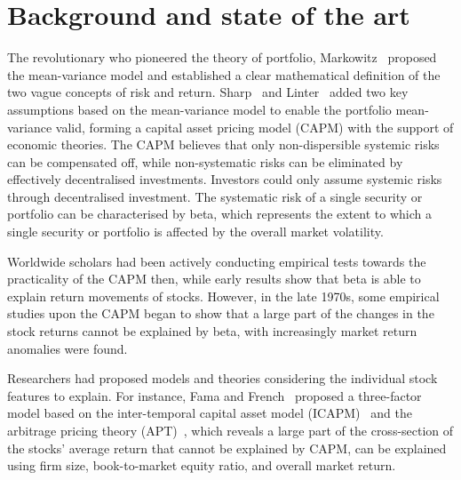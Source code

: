 \chapter[Background]{Background and state of the art}
The revolutionary who pioneered the theory of portfolio, Markowitz~\cite{portfolio} proposed the mean-variance model and established a clear mathematical definition of the two vague concepts of risk and return. Sharp~\cite{equilibrium} and Linter~\cite{diversification} added two key assumptions based on the mean-variance model to enable the portfolio mean-variance valid, forming a capital asset pricing model (CAPM) with the support of economic theories. The CAPM believes that only non-dispersible systemic risks can be compensated off, while non-systematic risks can be eliminated by effectively decentralised investments. Investors could only assume systemic risks through decentralised investment. The systematic risk of a single security or portfolio can be characterised by beta, which represents the extent to which a single security or portfolio is affected by the overall market volatility.

Worldwide scholars had been actively conducting empirical tests towards the practicality of the CAPM then, while early results show that beta is able to explain return movements of stocks. However, in the late 1970s, some empirical studies upon the CAPM began to show that a large part of the changes in the stock returns cannot be explained by beta, with increasingly market return anomalies were found.

Researchers had proposed models and theories considering the individual stock features to explain. For instance, Fama and French~\cite{riskfactors, anomalies} proposed a three-factor model based on the inter-temporal capital asset model (ICAPM)~\cite{intertemporal} and the arbitrage pricing theory (APT)~\cite{options}, which reveals a large part of the cross-section of the stocks’ average return that cannot be explained by CAPM, can be explained using firm size, book-to-market equity ratio, and overall market return.

